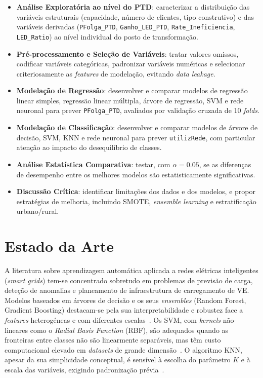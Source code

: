 \documentclass[conference]{IEEEtran}
\begin{document}
\begin{itemize}
    \item \textbf{Análise Exploratória ao nível do PTD}: caracterizar a distribuição das variáveis estruturais (capacidade, número de clientes, tipo construtivo) e das variáveis derivadas (\texttt{PFolga\_PTD}, \texttt{Ganho\_LED\_PTD}, \texttt{Rate\_Ineficiencia}, \texttt{LED\_Ratio}) ao nível individual do posto de transformação.
    \item \textbf{Pré-processamento e Seleção de Variáveis}: tratar valores omissos, codificar variáveis categóricas, padronizar variáveis numéricas e selecionar criteriosamente as \textit{features} de modelação, evitando \textit{data leakage}.
    \item \textbf{Modelação de Regressão}: desenvolver e comparar modelos de regressão linear simples, regressão linear múltipla, árvore de regressão, SVM e rede neuronal para prever \texttt{PFolga\_PTD}, avaliados por validação cruzada de 10 \textit{folds}.
    \item \textbf{Modelação de Classificação}: desenvolver e comparar modelos de árvore de decisão, SVM, KNN e rede neuronal para prever \texttt{utilizRede}, com particular atenção ao impacto do desequilíbrio de classes.
    \item \textbf{Análise Estatística Comparativa}: testar, com $\alpha = 0.05$, se as diferenças de desempenho entre os melhores modelos são estatisticamente significativas.
    \item \textbf{Discussão Crítica}: identificar limitações dos dados e dos modelos, e propor estratégias de melhoria, incluindo SMOTE, \textit{ensemble learning} e estratificação urbano/rural.
\end{itemize}

\section{Estado da Arte}

A literatura sobre aprendizagem automática aplicada a redes elétricas inteligentes (\textit{smart grids}) tem-se concentrado sobretudo em problemas de previsão de carga, deteção de anomalias e planeamento de infraestrutura de carregamento de VE. Modelos baseados em árvores de decisão e os seus \textit{ensembles} (Random Forest, Gradient Boosting) destacam-se pela sua interpretabilidade e robustez face a \textit{features} heterogéneas e com diferentes escalas~\cite{b1}. Os SVM, com \textit{kernels} não-lineares como o \textit{Radial Basis Function} (RBF), são adequados quando as fronteiras entre classes não são linearmente separáveis, mas têm custo computacional elevado em \textit{datasets} de grande dimensão~\cite{b1,b2}. O algoritmo KNN, apesar da sua simplicidade conceptual, é sensível à escolha do parâmetro $K$ e à escala das variáveis, exigindo padronização prévia~\cite{b2}.
\end{document}
